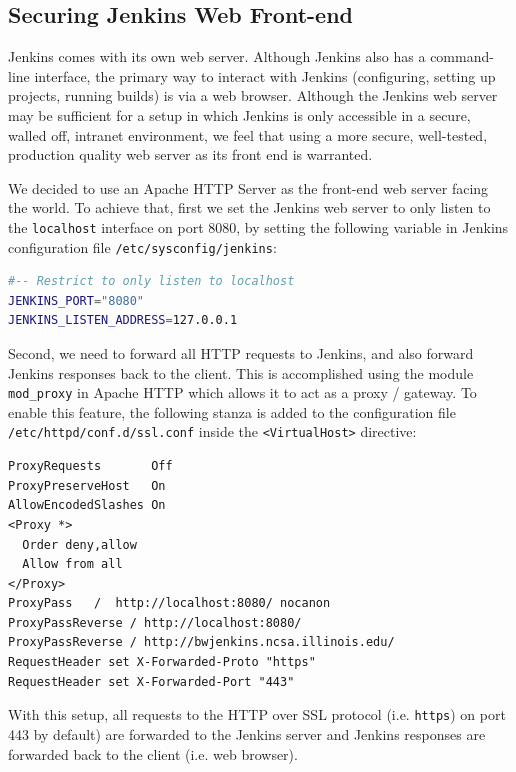 \documentclass[10pt, conference, compsocconf]{IEEEtran}
\begin{document}
\subsection{Securing Jenkins Web Front-end}

Jenkins comes with its own web server. 
Although Jenkins also has a command-line interface, the primary way to interact with Jenkins (configuring, setting up projects, running builds) is via a web browser. 
Although the Jenkins web server may be sufficient for a setup in which Jenkins is only accessible in a secure, walled off, intranet environment, we feel that using a more secure, well-tested, production quality web server as its front end is warranted.

We decided to use an Apache HTTP Server as the front-end web server facing the world. 
To achieve that, first we set the Jenkins web server to only listen to the \texttt{localhost} interface on port 8080, by setting the following variable in Jenkins configuration file \texttt{/etc/sysconfig/jenkins}:
\begin{lstlisting}[captionpos=t,language=bash,label=lst:jenkinsConfig]
#-- Restrict to only listen to localhost
JENKINS_PORT="8080"
JENKINS_LISTEN_ADDRESS=127.0.0.1
\end{lstlisting}

Second, we need to forward all HTTP requests to Jenkins, and also forward Jenkins responses back to the client. 
This is accomplished using the module \texttt{mod_proxy} \cite{ApacheModProxy} in Apache HTTP which allows it to act as a proxy / gateway. 
To enable this feature, the following stanza is added to the configuration file \texttt{/etc/httpd/conf.d/ssl.conf} inside the \texttt{<VirtualHost>} directive:

\begin{lstlisting}[frame=b,captionpos=b,label=lst:reverseProxy,caption=Relevant configuration lines for setting up reverse proxy in Apache HTTP Server]
ProxyRequests       Off
ProxyPreserveHost   On 
AllowEncodedSlashes On 
<Proxy *>
  Order deny,allow
  Allow from all  
</Proxy>
ProxyPass   /  http://localhost:8080/ nocanon
ProxyPassReverse / http://localhost:8080/
ProxyPassReverse / http://bwjenkins.ncsa.illinois.edu/
RequestHeader set X-Forwarded-Proto "https"
RequestHeader set X-Forwarded-Port "443"    
\end{lstlisting}

With this setup, all requests to the HTTP over SSL protocol (i.e. \texttt{https}) on port 443 by default) are forwarded to the Jenkins server and Jenkins responses are forwarded back to the client (i.e. web browser).
\end{document}
